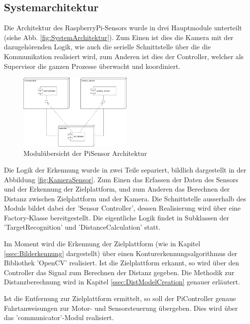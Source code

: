 \documentclass[a4paper]{report}
\begin{document}
\subsection{Systemarchitektur}
\label{ssec:SysArch}

Die Architektur des RaspberryPi-Sensors wurde in drei Hauptmodule unterteilt (siehe Abb. \ref{fig:SystemArchitektur}). Zum Einen ist dies die Kamera mit der dazugehörenden Logik, wie auch die serielle Schnittstelle über die die Kommunikation realisiert wird, zum Anderen ist dies der Controller, welcher als Supervisor die ganzen Prozesse überwacht und koordiniert.

\begin{figure}[h!]
	\centering
	\includegraphics[keepaspectratio,width=0.5\textwidth]{SystemArchitektur}
	\caption{Modulübersicht der PiSensor Architektur}
	\label{fig:PiSensorSystemArchitektur}
\end{figure}

Die Logik der Erkennung wurde in zwei Teile separiert, bildlich dargestellt in der Abbildung \ref{fig:KameraSensor}. Zum Einen das Erfassen der Daten des Sensors und der Erkennung der Zielplattform, und zum Anderen das Berechnen der Distanz zwischen Zielplattform und der Kamera. Die Schnittstelle ausserhalb des Moduls bildet dabei der 'Sensor Controller', dessen Realisierung wird über eine Factory-Klasse bereitgestellt. Die eigentliche Logik findet in Subklassen der 'TargetRecognition' und 'DistanceCalculation' statt.

Im Moment wird die Erkennung der Zielplattform (wie in Kapitel \ref{ssec:Bilderkennung} dargestellt) über einen Kontur\-erkennungs\-algorithmus der Bibliothek 'OpenCV' realisiert. Ist die Zielplattform erkannt, so wird über den Controller das Signal zum Berechnen der Distanz gegeben. Die Methodik zur Distanzberechnung wird in Kapitel \ref{ssec:DistModelCreation} genauer erläutert.

Ist die Entfernung zur Zielplattform ermittelt, so soll der PiController genaue Fahrtanweisungen zur Motor- und Sensorsteuerung übergeben. Dies wird über das 'communicator'-Modul realisiert.
\end{document}
